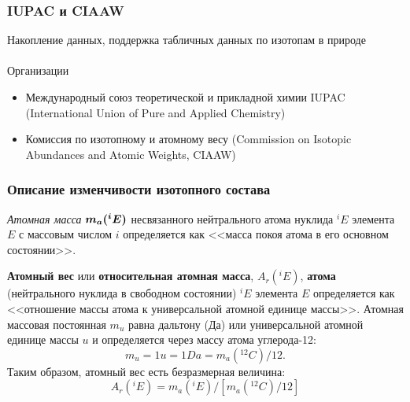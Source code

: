 \begin{frame}
\frametitle{IUPAC и CIAAW}

Накопление данных, поддержка табличных данных по изотопам в природе\\
~\\

Организации
\begin{itemize}
	\item
	Международный союз теоретической и прикладной химии IUPAC (International Union of Pure and Applied Chemistry) 
	\item
	Комиссия по изотопному и атомному весу (Commission on Isotopic Abundances and Atomic Weights, CIAAW) 
\end{itemize}

\end{frame}




\begin{frame}
\frametitle{Описание изменчивости изотопного состава}
\emph{Атомная масса} $\protect\text{\boldmath$m_a(^iE)$}$ несвязанного нейтрального атома нуклида $^iE$ элемента $E$ с массовым числом $i$  определяется как <<масса покоя атома в его основном состоянии>>. 

{\bf Атомный вес}  или {\bf относительная атомная масса}, $A_r(^iE)$, {\bf атома} (нейтрального нуклида в свободном состоянии) $^iE $ элемента $E$ определяется как <<отношение массы атома к универсальной атомной единице массы>>. 
\medskip
Атомная массовая постоянная $m_u$ равна дальтону (Да) или универсальной атомной единице массы $u$ и определяется через массу атома углерода-12:
\begin{equation}
m_u = 1 u = 1 Da = m_a(^{12}C)/12.
\end{equation}
Таким образом, атомный вес есть безразмерная величина:
\begin{equation} \label{ArE}
A_r(^iE) = m_a(^{i}E)/ \left[ m_a(^{12}C)/12 \right] 
\end{equation}


\end{frame}

